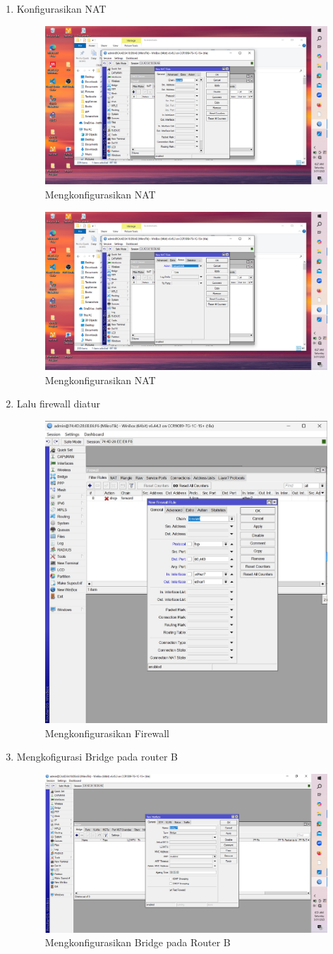 \begin{enumerate}
    \item Konfigurasikan NAT
    \begin{figure}[H]
        \centering
        \includegraphics[width=0.5\linewidth]{gambar5a.jpeg}
        \caption{Mengkonfigurasikan NAT}
        \label{fig:mengkonfigurasikan-NAT}
    \end{figure}

    \begin{figure}[H]
        \centering
        \includegraphics[width=0.5\linewidth]{gambar5b.jpeg}
        \caption{Mengkonfigurasikan NAT}
        \label{fig:mengkonfigurasikan-NAT}
    \end{figure}
    \item Lalu firewall diatur
    \begin{figure}[H]
        \centering
        \includegraphics[width=0.5\linewidth]{gambar6.jpeg}
        \caption{Mengkonfigurasikan Firewall}
        \label{fig:mengkonfigurasikan-firewall}
    \end{figure}
    \item Mengkofigurasi Bridge pada router B 
    \begin{figure}[H]
        \centering
        \includegraphics[width=0.5\linewidth]{gambar7a.jpeg}
        \caption{Mengkonfigurasikan Bridge pada Router B}
        \label{fig:mengkonfigurasikan-bridge-router-B}
    \end{figure}


\end{enumerate}
